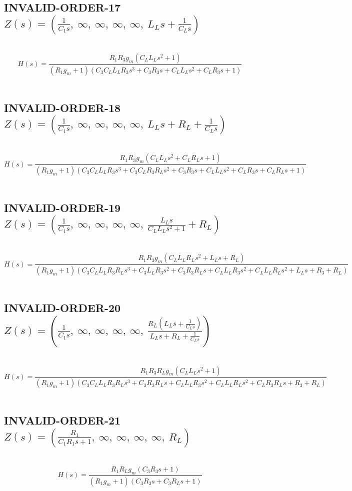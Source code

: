 \documentclass{article}
\begin{document}
\subsection{INVALID-ORDER-17 $Z(s) = \left( \frac{1}{C_{1} s}, \  \infty, \  \infty, \  \infty, \  \infty, \  L_{L} s + \frac{1}{C_{L} s}\right)$ } \ 
\textbf{\[H(s) = \frac{R_{1} R_{3} g_{m} \left(C_{L} L_{L} s^{2} + 1\right)}{\left(R_{1} g_{m} + 1\right) \left(C_{3} C_{L} L_{L} R_{3} s^{3} + C_{3} R_{3} s + C_{L} L_{L} s^{2} + C_{L} R_{3} s + 1\right)}\] } \ 
\subsection{INVALID-ORDER-18 $Z(s) = \left( \frac{1}{C_{1} s}, \  \infty, \  \infty, \  \infty, \  \infty, \  L_{L} s + R_{L} + \frac{1}{C_{L} s}\right)$ } \ 
\textbf{\[H(s) = \frac{R_{1} R_{3} g_{m} \left(C_{L} L_{L} s^{2} + C_{L} R_{L} s + 1\right)}{\left(R_{1} g_{m} + 1\right) \left(C_{3} C_{L} L_{L} R_{3} s^{3} + C_{3} C_{L} R_{3} R_{L} s^{2} + C_{3} R_{3} s + C_{L} L_{L} s^{2} + C_{L} R_{3} s + C_{L} R_{L} s + 1\right)}\] } \ 
\subsection{INVALID-ORDER-19 $Z(s) = \left( \frac{1}{C_{1} s}, \  \infty, \  \infty, \  \infty, \  \infty, \  \frac{L_{L} s}{C_{L} L_{L} s^{2} + 1} + R_{L}\right)$ } \ 
\textbf{\[H(s) = \frac{R_{1} R_{3} g_{m} \left(C_{L} L_{L} R_{L} s^{2} + L_{L} s + R_{L}\right)}{\left(R_{1} g_{m} + 1\right) \left(C_{3} C_{L} L_{L} R_{3} R_{L} s^{3} + C_{3} L_{L} R_{3} s^{2} + C_{3} R_{3} R_{L} s + C_{L} L_{L} R_{3} s^{2} + C_{L} L_{L} R_{L} s^{2} + L_{L} s + R_{3} + R_{L}\right)}\] } \ 
\subsection{INVALID-ORDER-20 $Z(s) = \left( \frac{1}{C_{1} s}, \  \infty, \  \infty, \  \infty, \  \infty, \  \frac{R_{L} \left(L_{L} s + \frac{1}{C_{L} s}\right)}{L_{L} s + R_{L} + \frac{1}{C_{L} s}}\right)$ } \ 
\textbf{\[H(s) = \frac{R_{1} R_{3} R_{L} g_{m} \left(C_{L} L_{L} s^{2} + 1\right)}{\left(R_{1} g_{m} + 1\right) \left(C_{3} C_{L} L_{L} R_{3} R_{L} s^{3} + C_{3} R_{3} R_{L} s + C_{L} L_{L} R_{3} s^{2} + C_{L} L_{L} R_{L} s^{2} + C_{L} R_{3} R_{L} s + R_{3} + R_{L}\right)}\] } \ 
\subsection{INVALID-ORDER-21 $Z(s) = \left( \frac{R_{1}}{C_{1} R_{1} s + 1}, \  \infty, \  \infty, \  \infty, \  \infty, \  R_{L}\right)$ } \ 
\textbf{\[H(s) = \frac{R_{1} R_{L} g_{m} \left(C_{3} R_{3} s + 1\right)}{\left(R_{1} g_{m} + 1\right) \left(C_{3} R_{3} s + C_{3} R_{L} s + 1\right)}\] } \ 
\end{document}
